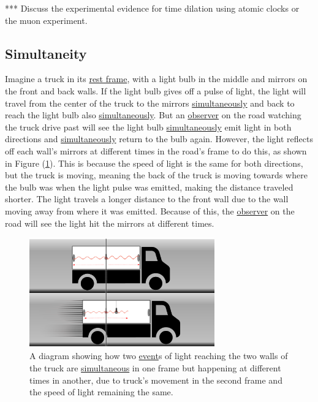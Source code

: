 *** Discuss the experimental evidence for time dilation using atomic clocks or the muon experiment.

\subsection{Simultaneity} \label{subsect: Simultaneity}

Imagine a truck in its \hyperlink{def-proper-frame}{rest frame}, with a light bulb in the middle and mirrors on the front and back walls.
If the light bulb gives off a pulse of light, the light will travel from the center of the truck to the mirrors \hyperlink{def-simultaneity}{simultaneously} and back to reach the light bulb also \hyperlink{def-simultaneity}{simultaneously}.
But an \hyperlink{def-observer}{observer} on the road watching the truck drive past will see the light bulb \hyperlink{def-simultaneity}{simultaneously} emit light in both directions and \hyperlink{def-simultaneity}{simultaneously} return to the bulb again.
However, the light reflects off each wall's mirrors at different times in the road's frame to do this, as shown in Figure (\ref{fig: truck simultaneity}).
This is because the speed of light is the same for both directions, but the truck is moving, meaning the back of the truck is moving towards where the bulb was when the light pulse was emitted, making the distance traveled shorter.
The light travels a longer distance to the front wall due to the wall moving away from where it was emitted.
Because of this, the \hyperlink{def-observer}{observer} on the road will see the light hit the mirrors at different times.

\begin{figure}[htbp]
	\centering
	\includegraphics[width = 8cm]{images/pdf/lorry_simul.pdf}
	\caption{A diagram showing how two \protect\hyperlink{def-event}{event}s of light reaching the two walls of the truck are \protect\hyperlink{def-simultaneity}{simultaneous} in one frame but happening at different times in another, due to truck's movement in the second frame and the speed of light remaining the same.}
	\label{fig: truck simultaneity}
\end{figure}


